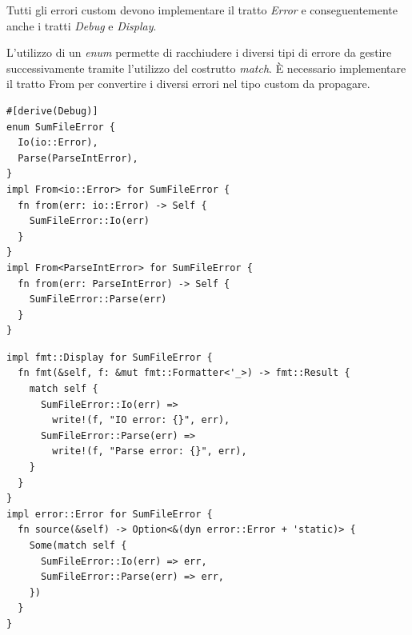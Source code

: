 Tutti gli errori custom devono implementare il tratto \textit{Error} e
conseguentemente anche i tratti \textit{Debug} e \textit{Display}.


L'utilizzo di un \textit{enum} permette di racchiudere i diversi tipi di errore da
gestire successivamente tramite l'utilizzo del costrutto \textit{match}.
È necessario implementare il tratto From per convertire i diversi errori nel tipo custom da
propagare.


\begin{center}
  \begin{minipage}{\linewidth}
    \begin{minipage}{0.49\linewidth}
      \begin{verbatim}
#[derive(Debug)]
enum SumFileError {
  Io(io::Error),
  Parse(ParseIntError),
}
impl From<io::Error> for SumFileError {
  fn from(err: io::Error) -> Self { 
    SumFileError::Io(err) 
  }
}
impl From<ParseIntError> for SumFileError {
  fn from(err: ParseIntError) -> Self { 
    SumFileError::Parse(err)
  }
}    
\end{verbatim}
    \end{minipage}%
    \hfill %
    \begin{minipage}{0.49\linewidth}

      \begin{verbatim}
impl fmt::Display for SumFileError {
  fn fmt(&self, f: &mut fmt::Formatter<'_>) -> fmt::Result {
    match self {
      SumFileError::Io(err) => 
        write!(f, "IO error: {}", err),
      SumFileError::Parse(err) => 
        write!(f, "Parse error: {}", err),
    }
  }
}
impl error::Error for SumFileError {
  fn source(&self) -> Option<&(dyn error::Error + 'static)> {
    Some(match self {
      SumFileError::Io(err) => err,
      SumFileError::Parse(err) => err,
    })
  }
}  
        \end{verbatim}


    \end{minipage}
  \end{minipage}
\end{center}



